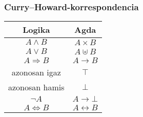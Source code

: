 \documentclass[14pt]{beamer}
\begin{document}
\begin{frame}
  \frametitle{Curry–Howard-korrespondencia}
  \begin{center}
    \begin{tabular}{| c | c |}
      \hline
      \textbf{Logika} & \textbf{Agda} \\ \hline \hline
      $A \wedge B$ & $A \times B$ \\ \hline
      $A \vee B$ & $A \uplus B$ \\ \hline
      $A \Rightarrow B$ & $A \to B$ \\ \hline
      azonosan igaz & $\top$ \\ \hline
      azonosan hamis & $\bot$ \\ \hline
      $\neg A$ & $A \to \bot$ \\ \hline
      $A \Leftrightarrow B$ & $A \leftrightarrow B$ \\ \hline
    \end{tabular}
  \end{center}
\end{frame}
\end{document}
